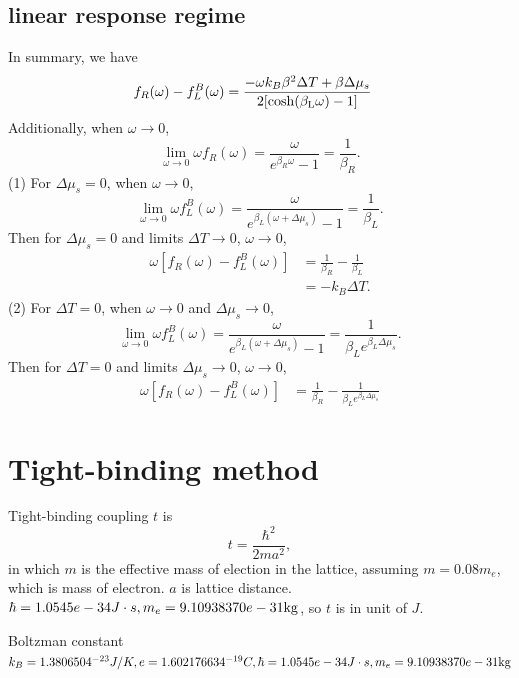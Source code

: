 \documentclass[aps,prb,onecolumn,amssymb,amsmath,superscriptaddress]{revtex4-1}
\begin{document}
\subsection{linear response regime}
In summary, we have
\begin{equation}
\begin{split}
f_{R}(\omega)-f_{L}^{B}(\omega) &= \frac{-\omega k_B\beta^2\Delta T + \beta\Delta\mu_s}{2[\rm{cosh}(\beta_{L}\omega)-1]}
\end{split}
\end{equation}
Additionally, when $\omega\to0$,
\[
\lim_{\omega\to0}\omega f_{R}(\omega) = \frac{\omega}{e^{\beta_{R}\omega}-1} = \frac{1}{\beta_R}.
\]
(1) For $\Delta\mu_s=0$, when $\omega\to0$,
\[
\lim_{\omega\to0}\omega f_{L}^{B}(\omega) = \frac{\omega}{e^{\beta_{L}(\omega+\Delta\mu_{s})}-1} = \frac{1}{\beta_L}.
\]
Then for $\Delta\mu_s=0$ and limits $\Delta T\to 0$, $\omega\to 0$,
\begin{equation}
\begin{split}
\omega[f_{R}(\omega)-f_{L}^{B}(\omega)] &= \frac{1}{\beta_R} - \frac{1}{\beta_L} \\
& = -k_B \Delta T.
\end{split}
\end{equation}
(2) For $\Delta T=0$, when $\omega\to0$ and $\Delta\mu_s\to 0$,
\[
\lim_{\omega\to0}\omega f_{L}^{B}(\omega) = \frac{\omega}{e^{\beta_{L}(\omega+\Delta\mu_{s})}-1} = \frac{1}{\beta_L e^{\beta_L \Delta\mu_s}}.
\]
Then for $\Delta T=0$ and limits $\Delta \mu_s\to 0$, $\omega\to 0$,
\begin{equation}
\begin{split}
\omega[f_{R}(\omega)-f_{L}^{B}(\omega)] &= \frac{1}{\beta_R} - \frac{1}{\beta_Le^{\beta_L \Delta\mu_s}} 
\end{split}
\end{equation}

\section{Tight-binding method}
Tight-binding coupling $t$ is 
\[
t = \frac{\hbar^{2}}{2ma^{2}},
\]
in which $m$ is the effective mass of election in the lattice, assuming $m=0.08m_{e}$, which is mass of electron. $a$ is lattice distance. $\hbar = 1.0545e-34J\cdot s, m_e = 9.10938370e-31\rm{kg}$, so $t$ is in unit of $J$.

Boltzman constant $k_B = 1.3806504^{-23}J/K, e = 1.602176634^{-19}C, \hbar = 1.0545e-34J\cdot s, m_e = 9.10938370e-31\rm{kg}$
\end{document}
